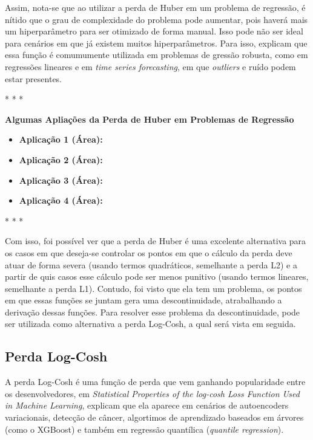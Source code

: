 Assim, nota-se que ao utilizar a perda de Huber em um problema de regressão, é nítido que o grau de complexidade do problema pode aumentar, pois haverá mais um hiperparâmetro para ser otimizado de forma manual. Isso pode não ser ideal para cenários em que já existem muitos hiperparâmetros. Para isso, \textcite{LossesArticle} explicam que essa função é comumumente utilizada em problemas de gressão robusta, como em regressões lineares e em \textit{time series forecasting}, em que \textit{outliers} e ruído podem estar presentes.

\medskip
\begin{center}
 * * *
\end{center}
\medskip

\textbf{Algumas Apliações da Perda de Huber em Problemas de Regressão}
\vspace{1em}

\begin{itemize}
    \item \textbf{Aplicação 1 (Área):}
    \item \textbf{Aplicação 2 (Área):}
    \item \textbf{Aplicação 3 (Área):}
    \item \textbf{Aplicação 4 (Área):}
\end{itemize}

\medskip
\begin{center}
 * * *
\end{center}
\medskip

Com isso, foi possível ver que a perda de Huber é uma excelente alternativa para os casos em que deseja-se controlar os pontos em que o cálculo da perda deve atuar de forma severa (usando termos quadráticos, semelhante a perda L2) e a partir de quis casos esse cálculo pode ser menos punitivo (usando termos lineares, semelhante a perda L1). Contudo, foi visto que ela tem um problema, os pontos em que essas funções se juntam gera uma descontinuidade, atrabalhando a derivação dessas funções. Para resolver esse problema da descontinuidade, pode ser utilizada como alternativa a perda Log-Cosh, a qual será vista em seguida.

\subsection{Perda Log-Cosh}

A perda Log-Cosh é uma função de perda que vem ganhando popularidade entre os desenvolvedores, em \textit{Statistical Properties of the log-cosh Loss Function Used in Machine Learning}, \textcite{StatisticalPropetiesLogCosh} explicam que ela aparece em cenários de autoencoders variacionais, detecção de câncer, algortimos de aprendizado baseados em árvores (como o XGBoost) e também em regressão quantílica (\textit{quantile regression}).

